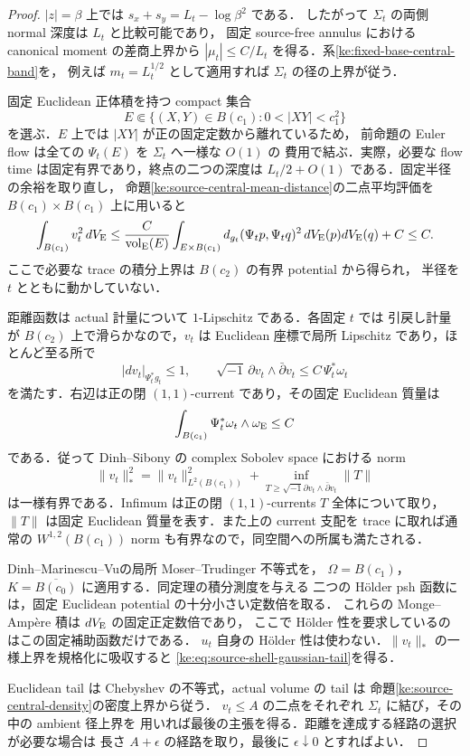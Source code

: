 \begin{proof}
$|z|=\beta$ 上では $s_x+s_y=L_t-\log\beta^2$ である．
したがって $\Sigma_t$ の両側 normal 深度は $L_t$ と比較可能であり，
固定 source-free annulus における canonical moment の差商上界から
$|\mu_t|\le C/L_t$ を得る．系\ref{ke:fixed-base-central-band}を，
例えば $m_t=L_t^{1/2}$ として適用すれば $\Sigma_t$ の径の上界が従う．

固定 Euclidean 正体積を持つ compact 集合
\[
 E\Subset\{(X,Y)\in B(c_1):0<|XY|<c_1^2\}
\]
を選ぶ．$E$ 上では $|XY|$ が正の固定定数から離れているため，
前命題の Euler flow は全ての $\Psi_t(E)$ を $\Sigma_t$ へ一様な $O(1)$ の
費用で結ぶ．実際，必要な flow time は固定有界であり，終点の二つの深度は
$L_t/2+O(1)$ である．固定半径の余裕を取り直し，
命題\ref{ke:source-central-mean-distance}の二点平均評価を
$B(c_1)\times B(c_1)$ 上に用いると
\[
 \int_{B(c_1)} v_t^2\,dV_{\rm E}
 \le \frac{C}{\operatorname{vol}_{\rm E}(E)}
       \int_{E\times B(c_1)}
       d_{g_t}(\Psi_t p,\Psi_t q)^2\,dV_{\rm E}(p)dV_{\rm E}(q)+C
 \le C.
\]
ここで必要な trace の積分上界は $B(c_2)$ の有界 potential から得られ，
半径を $t$ とともに動かしていない．

距離函数は actual 計量について $1$-Lipschitz である．各固定 $t$ では
引戻し計量が $B(c_2)$ 上で滑らかなので，$v_t$ は Euclidean 座標で局所 Lipschitz
であり，ほとんど至る所で
\[
 |dv_t|_{\Psi_t^*g_t}\le1,\qquad
 \sqrt{-1}\,\partial v_t\wedge\bar\partial v_t
 \le C\,\Psi_t^*\omega_t
\]
を満たす．右辺は正の閉 $(1,1)$-current であり，その固定 Euclidean 質量は
\[
 \int_{B(c_1)}\Psi_t^*\omega_t\wedge\omega_{\rm E}\le C
\]
である．従って Dinh--Sibony の complex Sobolev space における norm
\[
 \|v_t\|_*^2
 =\|v_t\|_{L^2(B(c_1))}^2+
 \inf_{T\ge\sqrt{-1}\partial v_t\wedge\bar\partial v_t}\|T\|
\]
は一様有界である．Infimum は正の閉 $(1,1)$-currents $T$ 全体について取り，
$\|T\|$ は固定 Euclidean 質量を表す．また上の current 支配を trace に取れば通常の
$W^{1,2}(B(c_1))$ norm も有界なので，同空間への所属も満たされる．

Dinh--Marinescu--Vu\cite[Theorem~1.2]{DMVMT}の局所 Moser--Trudinger 不等式を，
$\Omega=B(c_1)$，$K=\overline{B(c_0)}$ に適用する．同定理の積分測度を与える
二つの H\"older psh 函数には，固定 Euclidean potential の十分小さい定数倍を取る．
これらの Monge--Amp\`ere 積は $dV_{\rm E}$ の固定正定数倍であり，
ここで H\"older 性を要求しているのはこの固定補助函数だけである．
$u_t$ 自身の H\"older 性は使わない．$\|v_t\|_*$ の一様上界を規格化に吸収すると
\eqref{ke:eq:source-shell-gaussian-tail}を得る．

Euclidean tail は Chebyshev の不等式，actual volume の tail は
命題\ref{ke:source-central-density}の密度上界から従う．
$v_t\le A$ の二点をそれぞれ $\Sigma_t$ に結び，その中の ambient 径上界を
用いれば最後の主張を得る．距離を達成する経路の選択が必要な場合は
長さ $A+\epsilon$ の経路を取り，最後に $\epsilon\downarrow0$ とすればよい．
\end{proof}

